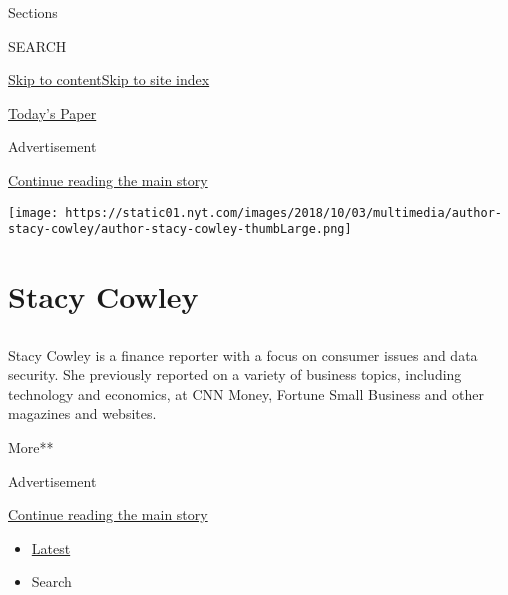 Sections

SEARCH

\protect\hyperlink{site-content}{Skip to
content}\protect\hyperlink{site-index}{Skip to site index}

\href{https://myaccount.nytimes.com/auth/login?response_type=cookie\&client_id=vi}{}

\href{https://www.nytimes.com/section/todayspaper}{Today's Paper}

Advertisement

\protect\hyperlink{after-top}{Continue reading the main story}

\texttt{[image: https://static01.nyt.com/images/2018/10/03/multimedia/author-stacy-cowley/author-stacy-cowley-thumbLarge.png]}

\hypertarget{stacy-cowley}{%
\section{Stacy Cowley}\label{stacy-cowley}}

\subsection{}

Stacy Cowley is a finance reporter with a focus on consumer issues and
data security. She previously reported on a variety of business topics,
including technology and economics, at CNN Money, Fortune Small Business
and other magazines and websites.

More**

Advertisement

\protect\hyperlink{after-mid1}{Continue reading the main story}

\begin{itemize}
\tightlist
\item
  \protect\hyperlink{stream-panel}{Latest}
\item
  Search
\end{itemize}

